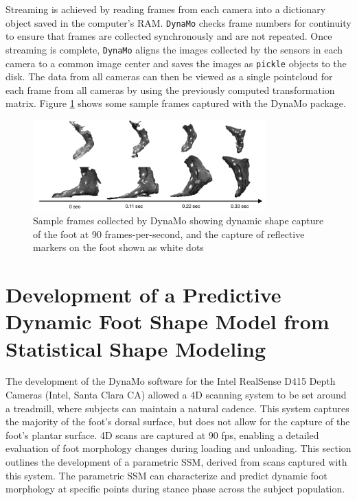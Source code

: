 \documentclass[defaultstyle,11pt]{comps}
\begin{document}
Streaming is achieved by reading frames from each camera into a dictionary object saved in the computer's RAM.
\texttt{DynaMo} checks frame numbers for continuity to ensure that frames are collected synchronously and are not repeated.
Once streaming is complete, \texttt{DynaMo} aligns the images collected by the sensors in each camera to a common image center and saves the images as \texttt{pickle} objects to the disk.
The data from all cameras can then be viewed as a single pointcloud for each frame from all cameras by using the previously computed transformation matrix.
Figure \ref{fig:SA2-sampleFrames} shows some sample frames captured with the DynaMo package.

\begin{figure}
\hypertarget{fig:SA2-sampleFrames}{%
\centering
\includegraphics[width=0.8\textwidth,height=\textheight]{../fig/SA2/sampleFrames.png}
\caption{Sample frames collected by DynaMo showing dynamic shape capture of the foot at 90 frames-per-second, and the capture of reflective markers on the foot shown as white dots}\label{fig:SA2-sampleFrames}
}
\end{figure}

\hypertarget{development-of-a-predictive-dynamic-foot-shape-model-from-statistical-shape-modeling}{%
\section{Development of a Predictive Dynamic Foot Shape Model from Statistical Shape Modeling}\label{development-of-a-predictive-dynamic-foot-shape-model-from-statistical-shape-modeling}}

The development of the DynaMo software \citep{Boppana2019} for the Intel RealSense D415 Depth Cameras (Intel, Santa Clara CA) allowed a 4D scanning system to be set around a treadmill, where subjects can maintain a natural cadence.
This system captures the majority of the foot's dorsal surface, but does not allow for the capture of the foot's plantar surface.
4D scans are captured at 90 fps, enabling a detailed evaluation of foot morphology changes during loading and unloading.
This section outlines the development of a parametric SSM, derived from scans captured with this system.
The parametric SSM can characterize and predict dynamic foot morphology at specific points during stance phase across the subject population.
\end{document}
